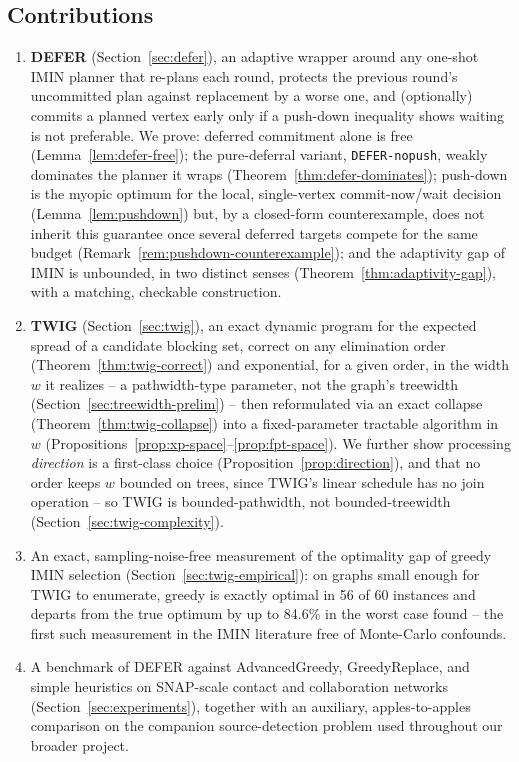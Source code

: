 \documentclass[ASNA,number]{USG}
\begin{document}
\subsection*{Contributions}
\begin{enumerate}
\item \textbf{DEFER} (Section~\ref{sec:defer}), an adaptive wrapper around
  any one-shot IMIN planner that re-plans each round, protects the
  previous round's uncommitted plan against replacement by a worse one,
  and (optionally) commits a planned vertex early only if a push-down
  inequality shows waiting is not preferable. We prove: deferred
  commitment alone is free (Lemma~\ref{lem:defer-free}); the pure-deferral
  variant, \texttt{DEFER-nopush}, weakly dominates the planner it wraps
  (Theorem~\ref{thm:defer-dominates}); push-down is the myopic optimum for
  the local, single-vertex commit-now/wait decision
  (Lemma~\ref{lem:pushdown}) but, by a closed-form counterexample, does
  not inherit this guarantee once several deferred targets compete for
  the same budget (Remark~\ref{rem:pushdown-counterexample}); and the
  adaptivity gap of IMIN is unbounded, in two distinct senses
  (Theorem~\ref{thm:adaptivity-gap}), with a matching, checkable
  construction.
\item \textbf{TWIG} (Section~\ref{sec:twig}), an exact dynamic program for
  the expected spread of a candidate blocking set, correct on any
  elimination order (Theorem~\ref{thm:twig-correct}) and exponential, for
  a given order, in the width $w$ it realizes -- a pathwidth-type
  parameter, not the graph's treewidth (Section~\ref{sec:treewidth-prelim}) --
  then reformulated via an exact collapse (Theorem~\ref{thm:twig-collapse})
  into a fixed-parameter tractable algorithm in $w$
  (Propositions~\ref{prop:xp-space}--\ref{prop:fpt-space}). We further show
  processing \emph{direction} is a first-class choice
  (Proposition~\ref{prop:direction}), and that no order keeps $w$ bounded
  on trees, since TWIG's linear schedule has no join operation -- so TWIG
  is bounded-pathwidth, not bounded-treewidth
  (Section~\ref{sec:twig-complexity}).
\item An exact, sampling-noise-free measurement of the optimality gap of
  greedy IMIN selection (Section~\ref{sec:twig-empirical}): on graphs small
  enough for TWIG to enumerate, greedy is exactly optimal in 56 of 60
  instances and departs from the true optimum by up to 84.6\% in the worst
  case found -- the first such measurement in the IMIN literature free of
  Monte-Carlo confounds.
\item A benchmark of DEFER against AdvancedGreedy, GreedyReplace, and
  simple heuristics on SNAP-scale contact and collaboration networks
  (Section~\ref{sec:experiments}), together with an auxiliary,
  apples-to-apples comparison on the companion source-detection problem
  used throughout our broader project.
\end{enumerate}
\end{document}
